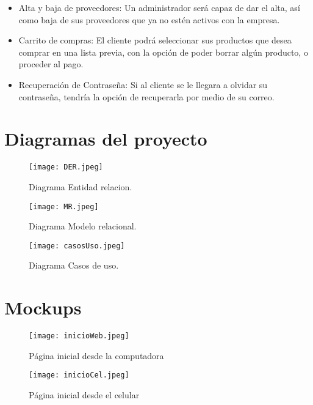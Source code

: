\documentclass[conference]{IEEEtran}
\begin{document}
\begin{itemize}
	\item Alta y baja de proveedores:
	\subitem Un administrador será capaz de dar el
	alta, así como baja de sus proveedores
	que ya no estén activos con la empresa.
	
	\item Carrito de compras:
	\subitem El cliente podrá seleccionar sus
	productos que desea comprar en una
	lista previa, con la opción de poder
	borrar algún producto, o proceder al
	pago.
	
	\item Recuperación de Contraseña:
	\subitem Si al cliente se le llegara a olvidar su
	contraseña, tendría la opción de
	recuperarla por medio de su correo.
	
	
\end{itemize}


\section{Diagramas del proyecto}
	
	\begin{figure}[htbp]
		\centering
		\texttt{[image: DER.jpeg]}
		\caption{Diagrama Entidad relacion.}
		\label{fig: Diagrama Entidad relacion.}
	\end{figure}
	
	\begin{figure}[htbp]
		\centering
		\texttt{[image: MR.jpeg]}
		\caption{Diagrama Modelo relacional.}
		\label{fig: Modelo relacional.}
	\end{figure}
	\newpage

	\begin{figure}[htbp]
		\centering
		\texttt{[image: casosUso.jpeg]}
		\caption{Diagrama Casos de uso.}
		\label{fig: Diagrama casos de uso}
	\end{figure}
	
\newpage
	
\section{Mockups}

	\begin{figure}[htbp]
		\centering
		\texttt{[image: inicioWeb.jpeg]}
		\caption{Página inicial desde la computadora}
		\label{fig: Página inicial desde la computadora.}
	\end{figure}
	
	\begin{figure}[htbp]
		\centering
		\texttt{[image: inicioCel.jpeg]}
		\caption{Página inicial desde el celular}
		\label{fig: Página inicial desde el celular.}
	\end{figure}
	
\end{document}
